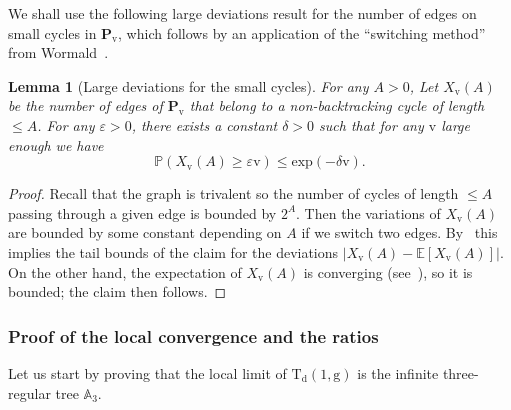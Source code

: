 \documentclass[JEP,XML,SOM,Unicode,NoFloatCountersInSection,NoEqCountersInSection]{cedram}
\theoremstyle{plain}
\newtheorem{lemma}[theorem]{Lemma}
\theoremstyle{definition}
\theoremstyle{remark}
\renewcommand{\P}{\mathbb{P}}
\newcommand{\E}{\mathbb{E}}
\newcommand{\Triv}{\mathrm{T}}
\newcommand{\defect}{\mathrm{d}}
\newcommand{\gen}{\mathrm{g}}
\newcommand{\ver}{\mathrm{v}}
\begin{document}
We shall use the following large deviations result for the number of edges on small cycles in $\mathbf{P}_{\ver}$, which follows by an application of the ``switching method'' from Wormald~\cite[Th.\,2.19]{Wor99}.

\begin{lemma}[Large deviations for the small cycles]
\label{lem:grandes_dev_cycles_config}
For any $A>0$, Let $X_{ \ver}(A)$ be the number of edges of $\mathbf{P}_{\ver}$ that belong to a non-backtracking cycle of length $\leq A$. For any $ \varepsilon>0$, there exists a constant $ \delta >0$ such that for any $\ver$ large enough we have
\[
\P(X_{ \ver}(A) \geq \varepsilon \ver) \leq \mathrm{exp}(- \delta \ver).
\]
\end{lemma}

\begin{proof}
Recall that the graph is trivalent so the number of cycles of length $\leq A$ passing through a given edge is bounded by $2^A$. Then the variations of $ X_{ \ver}(A)$ are bounded by some constant depending on $A$ if we switch two edges. By~\cite[Th.\,2.19]{Wor99} this implies the tail bounds of the claim for the deviations $|X_{ \ver}(A) - \E[X_{ \ver}(A)]|$. On the other hand, the expectation of $X_{ \ver}(A)$ is converging (see~\cite[Eq.\,(8) in \S2.3]{Wor99}), so it is bounded; the claim then follows.
\end{proof}

\subsubsection{Proof of the local convergence and the ratios}

Let us start by proving that the local limit of $ \Triv_{\defect}(1, \gen)$ is the infinite three-regular tree $\mathbb{A}_3$.
\end{document}
